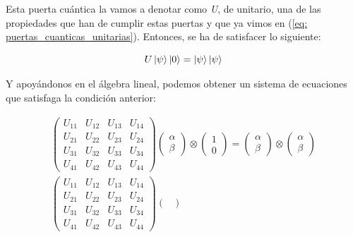 \documentclass[12pt]{article}
\numberwithin{equation}{section} %
\begin{document}
    \vspace{2.5mm}

    Esta puerta cuántica la vamos a denotar como \textit{U}, de unitario, una de las propiedades que han de cumplir estas puertas y que ya vimos en (\ref{eq: puertas_cuanticas_unitarias}). Entonces, se ha de satisfacer lo siguiente:
    
    \begin{equation*}
        U \ket{\psi} \ket{0} = \ket{\psi} \ket{\psi}
    \end{equation*}

    \vspace{2.5mm}

    Y apoyándonos en el álgebra lineal, podemos obtener un sistema de ecuaciones que satisfaga la condición anterior:

    \begin{gather*}
        \begin{pmatrix}
            U_{11} & U_{12} & U_{13} & U_{14} \\
            U_{21} & U_{22} & U_{23} & U_{24} \\
            U_{31} & U_{32} & U_{33} & U_{34} \\
            U_{41} & U_{42} & U_{43} & U_{44}
        \end{pmatrix} \begin{pmatrix}
            \alpha \\
            \beta
        \end{pmatrix} \otimes \begin{pmatrix}
            1 \\
            0
        \end{pmatrix} = \begin{pmatrix}
            \alpha \\
            \beta
        \end{pmatrix} \otimes \begin{pmatrix}
            \alpha \\
            \beta
        \end{pmatrix} \\[5pt]
        \begin{pmatrix}
            U_{11} & U_{12} & U_{13} & U_{14} \\
            U_{21} & U_{22} & U_{23} & U_{24} \\
            U_{31} & U_{32} & U_{33} & U_{34} \\
            U_{41} & U_{42} & U_{43} & U_{44}
        \end{pmatrix} \begin{pmatrix}

\end{pmatrix}
\end{gather*}
\end{document}
